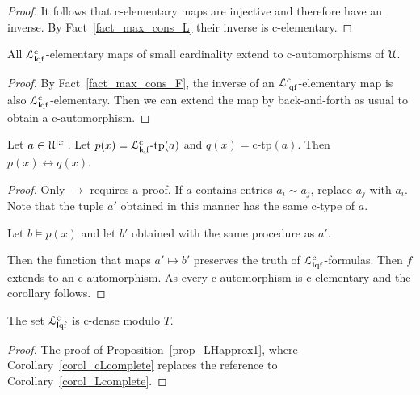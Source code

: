 \documentclass[10pt,oneside]{amsproc}
\begin{document}
{\begin{proof}
  It follows that c-elementary maps are injective and therefore have an inverse.
  By Fact~\ref{fact_max_cons_L} their inverse is c-elementary.
\end{proof}

\begin{proposition}
  All ${\EuScript L}^{\rm c}_{{\sf I}{\rm qf}}$-elementary maps of small cardinality extend to c-automorphisms of ${\EuScript U}$.
\end{proposition}

\begin{proof}
  By Fact~\ref{fact_max_cons_F}, the inverse of an ${\EuScript L}^{\rm c}_{{\sf I}{\rm qf}}$-elementary map is also ${\EuScript L}^{\rm c}_{{\sf I}{\rm qf}}$-elementary.
  Then we can extend the map by back-and-forth as usual to obtain a c-automorphism.
\end{proof}


\begin{corollary}\label{corol_cLcomplete}
  Let $a\in{\EuScript U}^{|x|}$.
  Let $p(x)={\EuScript L}^{\rm c}_{{\sf I}{\rm qf}}\mbox{-tp}(a)$ and $q(x)=\mbox{c-tp}(a)$. Then $p(x)\leftrightarrow q(x)$.
\end{corollary}

\begin{proof}
  Only $\rightarrow$ requires a proof.
  If $a$ contains entries $a_i\sim a_j$, replace $a_j$ with $a_i$.
  Note that the tuple $a'$ obtained in this manner has the same c-type of $a$.
 
  Let $b\models p(x)$ and let $b'$ obtained with the same procedure as $a'$.
  
  Then the function that maps $a'\mapsto b'$ preserves the truth of ${\EuScript L}^{\rm c}_{{\sf I}{\rm qf}}$-formulas.
  Then $f$ extends to an c-automorphism.
  As every c-automorphism is c-elementary and the corollary follows.
\end{proof}


\begin{proposition}\label{prop_cLHapprox1}
  The set ${\EuScript L}^{\rm c}_{{\sf I}{\rm qf}}$ is c-dense modulo $T$.
\end{proposition}

\begin{proof}
  The proof of Proposition~\ref{prop_LHapprox1}, where Corollary~\ref{corol_cLcomplete} replaces the reference to Corollary~\ref{corol_Lcomplete}.
\end{proof}
}
\end{document}

